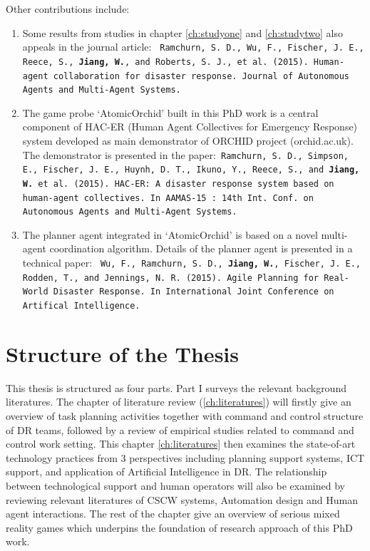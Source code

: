 Other contributions include:

\begin{enumerate}
\item Some results from studies in chapter \ref{ch:studyone} and \ref{ch:studytwo} also appeals in the journal article:
\texttt{ Ramchurn, S. D., Wu, F., Fischer, J. E., Reece, S., \textbf{Jiang, W.}, and Roberts, S. J., et al. (2015). Human-agent collaboration for disaster response. Journal of Autonomous Agents and Multi-Agent Systems.}\\

\item The game probe `AtomicOrchid' built in this PhD work is a central component of HAC-ER (Human Agent Collectives for Emergency Response) system  developed as main demonstrator of ORCHID project (orchid.ac.uk). The demonstrator is presented in the paper:\texttt{  Ramchurn, S. D., Simpson, E., Fischer, J. E., Huynh, D. T., Ikuno, Y., Reece, S., and \textbf{ Jiang, W.} et al. (2015). HAC-ER: A disaster response system based on human-agent collectives. In AAMAS-15 : 14th Int. Conf. on Autonomous Agents and Multi-Agent Systems.} \\ 

\item The planner agent integrated in `AtomicOrchid' is based on a novel multi-agent coordination algorithm. Details of the planner agent is presented in a technical paper: \texttt{ Wu, F., Ramchurn, S. D., \textbf{Jiang, W.}, Fischer, J. E., Rodden, T., and Jennings, N. R. (2015). Agile Planning for Real-World Disaster Response. In International Joint Conference on Artifical Intelligence.}

\end{enumerate} 

\section{Structure of the Thesis}
This thesis is structured as four parts. Part I surveys the relevant background literatures. The chapter of literature review (\ref{ch:literatures}) will firstly give an overview of task planning activities together with command and control structure of DR teams, followed by a review of empirical studies related to command and control work setting. This chapter \ref{ch:literatures} then examines the state-of-art technology practices from 3 perspectives including planning support systems, \ac{ICT} support, and application of Artificial Intelligence in DR. The relationship between technological support and human operators will also be examined by reviewing relevant literatures of \ac{CSCW} systems, Automation design and Human agent interactions. The rest of the chapter give an overview of serious mixed reality games which underpins the foundation of research approach of this PhD work.\\

